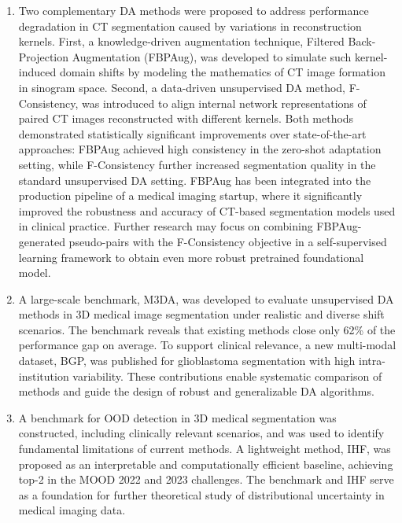 \begin{enumerate}
    \item Two complementary DA methods were proposed to address performance degradation in CT segmentation caused by variations in reconstruction kernels. First, a knowledge-driven augmentation technique, Filtered Back-Projection Augmentation (FBPAug), was developed to simulate such kernel-induced domain shifts by modeling the mathematics of CT image formation in sinogram space. Second, a data-driven unsupervised DA method, F-Consistency, was introduced to align internal network representations of paired CT images reconstructed with different kernels. Both methods demonstrated statistically significant improvements over state-of-the-art approaches: FBPAug achieved high consistency in the zero-shot adaptation setting, while F-Consistency further increased segmentation quality in the standard unsupervised DA setting. FBPAug has been integrated into the production pipeline of a medical imaging startup, where it significantly improved the robustness and accuracy of CT-based segmentation models used in clinical practice. Further research may focus on combining FBPAug-generated pseudo-pairs with the F-Consistency objective in a self-supervised learning framework to obtain even more robust pretrained foundational model.
    
    \item A large-scale benchmark, M3DA, was developed to evaluate unsupervised DA methods in 3D medical image segmentation under realistic and diverse shift scenarios. The benchmark reveals that existing methods close only 62\% of the performance gap on average. To support clinical relevance, a new multi-modal dataset, BGP, was published for glioblastoma segmentation with high intra-institution variability. These contributions enable systematic comparison of methods and guide the design of robust and generalizable DA algorithms.
    
    \item A benchmark for OOD detection in 3D medical segmentation was constructed, including clinically relevant scenarios, and was used to identify fundamental limitations of current methods. A lightweight method, IHF, was proposed as an interpretable and computationally efficient baseline, achieving top-2 in the MOOD 2022 and 2023 challenges. The benchmark and IHF serve as a foundation for further theoretical study of distributional uncertainty in medical imaging data.
    
\end{enumerate}

